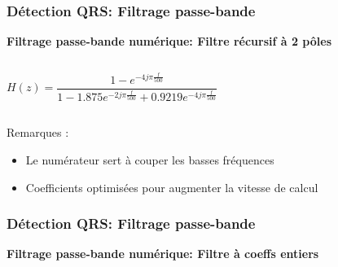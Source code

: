 \documentclass{beamer}
\begin{document}
\begin{frame}
\frametitle{Détection QRS: Filtrage passe-bande}
 \textbf{Filtrage passe-bande numérique: Filtre récursif à  2 pôles}\\
\begin{columns}
\column{60mm}
\[H(z) = \frac{1 - e^{-4 j \pi \frac{f}{500}}}{1 - 1.875 e^{-2 j \pi \frac{f}{500}} + 0.9219  e^{-4 j \pi \frac{f}{500}}} \]
\column{60mm} 
\begin{center}
\end{center}
\end{columns}
\vspace{0.3cm}
Remarques :
\begin{itemize}
\item Le numérateur sert à couper les basses fréquences
\item Coefficients optimisées pour augmenter la vitesse de calcul
\end{itemize}
\end{frame}

\begin{frame}
\frametitle{Détection QRS: Filtrage passe-bande}
 \textbf{Filtrage passe-bande numérique: Filtre à coeffs entiers}\\
\end{frame}
\end{document}
